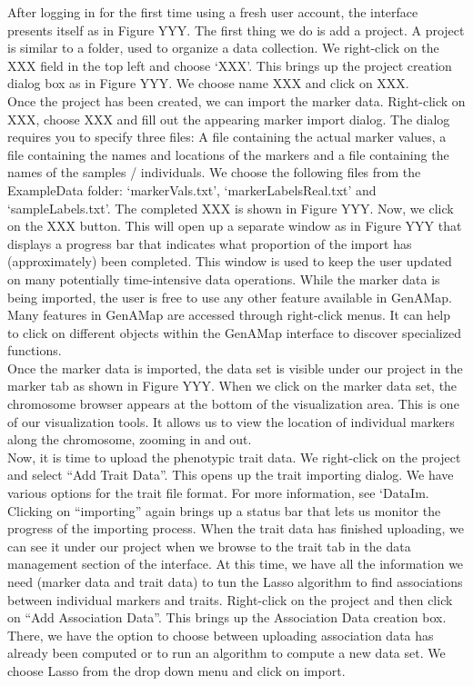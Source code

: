 \documentclass[12pt]{article}
\begin{document}
After logging in for the first time using a fresh user account, the interface presents itself as in Figure YYY. The first thing we do is add a project. A project is similar to a folder, used to organize a data collection. We right-click on the XXX field in the top left and choose `XXX'. This brings up the project creation dialog box as in Figure YYY. We choose name XXX and click on XXX.\\

Once the project has been created, we can import the marker data. Right-click on XXX, choose XXX and fill out the appearing marker import dialog. The dialog requires you to specify three files: A file containing the actual marker values, a file containing the names and locations of the markers and a file containing the names of the samples / individuals. We choose the following files from the ExampleData folder: `markerVals.txt', `markerLabelsReal.txt' and `sampleLabels.txt'. The completed XXX is shown in Figure YYY. Now, we click on the XXX button. This will open up a separate window as in Figure YYY that displays a progress bar that indicates what proportion of the import has (approximately) been completed. This window is used to keep the user updated on many potentially time-intensive data operations. While the marker data is being imported, the user is free to use any other feature available in GenAMap.\\

Many features in GenAMap are accessed through right-click menus. It can help to click on different objects within the GenAMap interface to discover specialized functions.\\

Once the marker data is imported, the data set is visible under our project in the marker tab as shown in Figure YYY. When we click on the marker data set, the chromosome browser appears at the bottom of the visualization area. This is one of our visualization tools. It allows us to view the location of individual markers along the chromosome, zooming in and out. \\

Now, it is time to upload the phenotypic trait data. We right-click on the project and select ``Add Trait Data''. This opens up the trait importing dialog. We have various options for the trait file format. For more information, see `DataIm. Clicking on ``importing'' again brings up a status bar that lets us monitor the progress of the importing process. When the trait data has finished uploading, we can see it under our project when we browse to the trait tab in the data management section of the interface. At this time, we have all the information we need (marker data and trait data) to tun the Lasso algorithm to find associations between individual markers and traits. Right-click on the project and then click on ``Add Association Data''. This brings up the Association Data creation box. There, we have the option to choose between uploading association data has already been computed or to run an algorithm to compute a new data set. We choose Lasso from the drop down menu and click on import. 
\end{document}
